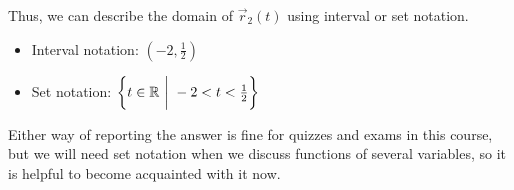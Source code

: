 \documentclass[noauthor, handout]{ximera}
\begin{document}
\begin{problem}
\begin{freeResponse}
Thus, we can describe the domain of $\vec{r}_2(t)$ using interval or set notation.

\begin{itemize}
\item Interval notation: $\left(-2, \frac{1}{2} \right)$ 
\item Set notation: $\left\{ t \in \mathbb R ~ \bigg| ~ -2< t < \frac{1}{2} \right\}$
\end{itemize}


\begin{remark}
Either way of reporting the answer is fine for quizzes and exams in this course, but we will need set notation when we discuss functions of several variables, so it is helpful to become acquainted with it now.
\end{remark}

\end{freeResponse}

\end{problem}

\end{document}
